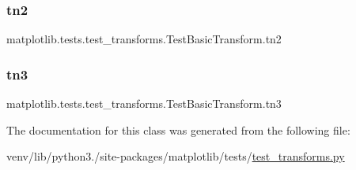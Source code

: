 \subsubsection{\texorpdfstring{tn2}{tn2}}
{\footnotesize\ttfamily matplotlib.\+tests.\+test\+\_\+transforms.\+Test\+Basic\+Transform.\+tn2}

\mbox{\label{classmatplotlib_1_1tests_1_1test__transforms_1_1TestBasicTransform_a4702c76e1f206ee82971678e5ec84a05}} 
\subsubsection{\texorpdfstring{tn3}{tn3}}
{\footnotesize\ttfamily matplotlib.\+tests.\+test\+\_\+transforms.\+Test\+Basic\+Transform.\+tn3}



The documentation for this class was generated from the following file\+:\begin{DoxyCompactItemize}
\item 
venv/lib/python3./site-\/packages/matplotlib/tests/\hyperlink{test__transforms_8py}{test\+\_\+transforms.\+py}\end{DoxyCompactItemize}
